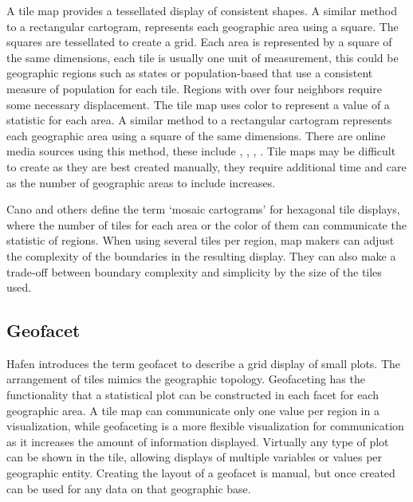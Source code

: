 \documentclass{monashthesis}
\begin{document}
A tile map provides a tessellated display of consistent shapes. A similar method to a rectangular cartogram, represents each geographic area using a square. The squares are tessellated to create a grid. Each area is represented by a square of the same dimensions, each tile is usually one unit of measurement, this could be geographic regions such as states or population-based that use a consistent measure of population for each tile. Regions with over four neighbors require some necessary displacement. The tile map uses color to represent a value of a statistic for each area. A similar method to a rectangular cartogram represents each geographic area using a square of the same dimensions. There are online media sources using this method, these include \autocite{NPR}, \autocite{FiveThirtyEight}, \autocite{WSJ}, \autocite{WP}. Tile maps may be difficult to create as they are best created manually, they require additional time and care as the number of geographic areas to include increases.

Cano and others \autocite{MDAC} define the term `mosaic cartograms' for hexagonal tile displays, where the number of tiles for each area or the color of them can communicate the statistic of regions. When using several tiles per region, map makers can adjust the complexity of the boundaries in the resulting display. They can also make a trade-off between boundary complexity and simplicity by the size of the tiles used.

\hypertarget{geofacet}{%
\subsection{Geofacet}\label{geofacet}}

Hafen \autocite{IGF} introduces the term geofacet to describe a grid display of small plots. The arrangement of tiles mimics the geographic topology. Geofaceting has the functionality that a statistical plot can be constructed in each facet for each geographic area. A tile map can communicate only one value per region in a visualization, while geofaceting is a more flexible visualization for communication as it increases the amount of information displayed. Virtually any type of plot can be shown in the tile, allowing displays of multiple variables or values per geographic entity. Creating the layout of a geofacet is manual, but once created can be used for any data on that geographic base.

\begin{Shaded}
\begin{Highlighting}[]
\OperatorTok{::}\NormalTok{(}\NormalTok{)}
\end{Highlighting}
\end{Shaded}
\end{document}
